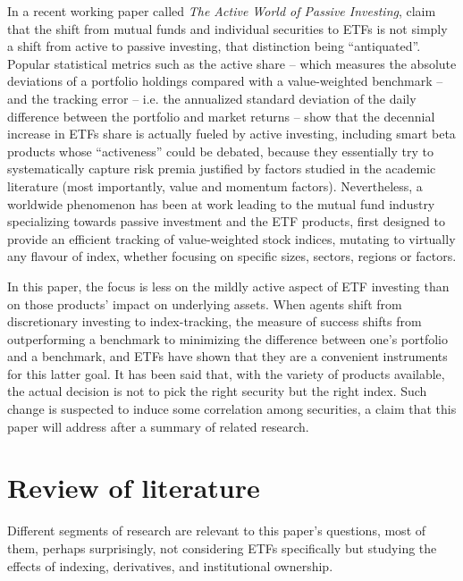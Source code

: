 In a recent working paper called \textit{The Active World of Passive Investing}, \cite{Easley2018} claim that the shift from mutual funds and individual securities to ETFs is not simply a shift from active to passive investing, that distinction being ``antiquated''. Popular statistical metrics such as the active share -- which measures the absolute deviations of a portfolio holdings compared with a value-weighted benchmark -- and the tracking error -- i.e. the annualized standard deviation of the daily difference between the portfolio and market returns -- show that the decennial increase in ETFs share is actually fueled by active investing, including smart beta products whose ``activeness'' could be debated, because they essentially try to systematically capture risk premia justified by factors studied in the academic literature (most importantly, value and momentum factors). Nevertheless, a worldwide phenomenon has been at work leading to the mutual fund industry specializing towards passive investment and the ETF products, first designed to provide an efficient tracking of value-weighted stock indices, mutating to virtually any flavour of index, whether focusing on specific sizes, sectors, regions or factors.

In this paper, the focus is less on the mildly active aspect of ETF investing than on those products' impact on underlying assets. When agents shift from discretionary investing to index-tracking, the measure of success shifts from outperforming a benchmark to minimizing the difference between one's portfolio and a benchmark, and ETFs have shown that they are a convenient instruments for this latter goal. It has been said that, with the variety of products available, the actual decision is not to pick the right security but the right index. Such change is suspected to induce some correlation among securities, a claim that this paper will address after a summary of related research.

\section{Review of literature}
Different segments of research are relevant to this paper's questions, most of them, perhaps surprisingly, not considering ETFs specifically but studying the effects of indexing, derivatives, and institutional ownership.

